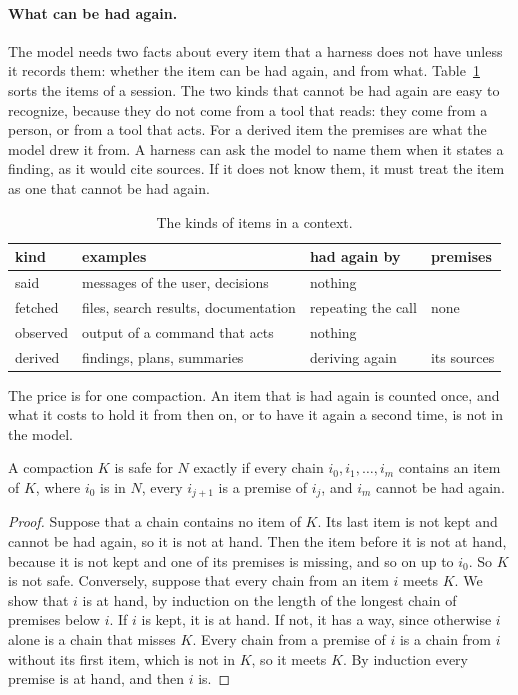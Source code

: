 \documentclass[acmsmall,nonacm,screen]{acmart}
\begin{document}
\paragraph{What can be had again.} The model needs two facts about every item that a
harness does not have unless it records them: whether the item can be had again, and from
what. Table~\ref{tab:kinds} sorts the items of a session. The two kinds that cannot be had
again are easy to recognize, because they do not come from a tool that reads: they come from
a person, or from a tool that acts. For a derived item the premises are what the model drew
it from. A harness can ask the model to name them when it states a finding, as it would cite
sources. If it does not know them, it must treat the item as one that cannot be had again.

\begin{table}
\caption{The kinds of items in a context.}\label{tab:kinds}
\begin{tabular}{llll}
\toprule
kind & examples & had again by & premises \\
\midrule
said & messages of the user, decisions & nothing & \\
fetched & files, search results, documentation & repeating the call & none \\
observed & output of a command that acts & nothing & \\
derived & findings, plans, summaries & deriving again & its sources \\
\bottomrule
\end{tabular}
\end{table}

The price is for one compaction. An item that is had again is counted once, and what it
costs to hold it from then on, or to have it again a second time, is not in the model.

\begin{lemma}\label{lem:cut}
A compaction $K$ is safe for $N$ exactly if every chain $i_0, i_1, \ldots, i_m$ contains an
item of $K$, where $i_0$ is in $N$, every $i_{j+1}$ is a premise of $i_j$, and $i_m$ cannot
be had again.
\end{lemma}

\begin{proof}
Suppose that a chain contains no item of $K$. Its last item is not kept and cannot be had
again, so it is not at hand. Then the item before it is not at hand, because it is not kept
and one of its premises is missing, and so on up to $i_0$. So $K$ is not safe. Conversely,
suppose that every chain from an item $i$ meets $K$. We show that $i$ is at hand, by
induction on the length of the longest chain of premises below $i$. If $i$ is kept, it is at
hand. If not, it has a way, since otherwise $i$ alone is a chain that misses $K$. Every
chain from a premise of $i$ is a chain from $i$ without its first item, which is not in $K$,
so it meets $K$. By induction every premise is at hand, and then $i$ is.
\end{proof}
\end{document}
